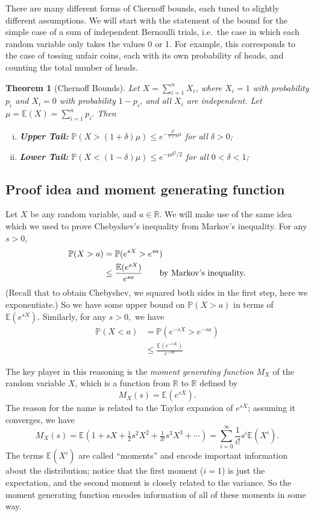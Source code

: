 \documentclass[10pt]{article}
\newtheorem{theorem}{Theorem}
\newcommand{\E}{\mathbb{E}}
\renewcommand{\Pr}{\mathbb{P}}
\begin{document}
There are many different forms of Chernoff bounds, each tuned to
slightly different assumptions. We will start with the statement of
the bound for the simple case of a sum of independent Bernoulli trials, i.e.~the case in which each random variable only takes the values 0 or 1. For example, this corresponds to the case of tossing unfair coins, each with its own probability of heads, and counting the total number of heads.   
\begin{theorem}[Chernoff Bounds]\label{thm:chernoff}
    Let $X = \sum_{i=1}^n X_i$, where $X_i = 1$ with probability $p_i$ and $X_i = 0$ with probability $1-p_i$, and all $X_i$ are independent.
    Let $\mu = \E(X) = \sum_{i=1}^n p_i.$ Then
    \begin{enumerate}[(i)]
        \item {\bf Upper Tail:} $\displaystyle\Pr(X > (1 + \delta)\mu) \leq
          e^{-\frac{\delta^2}{2 + \delta} \mu}$ for all $\delta > 0$;
            \item {\bf Lower Tail:} $\displaystyle\Pr(X  < (1 - \delta)\mu) \leq e^{-\mu \delta^2/2}$ for all $0 < \delta < 1$;
        \end{enumerate}
\end{theorem}



\subsection{Proof idea and moment generating function}


Let $X$ be any random variable, and $a \in \mathbb{R}$.
We will make use of the same idea which we used to prove Chebyshev's inequality from Markov's inequality.
For any $s > 0$, 
\begin{align}
\Pr(X > a) &= \Pr(e^{sX} > e^{sa}) \notag\\
           &\leq \frac{\E(e^{sX})}{e^{sa}} \qquad \text{by Markov's
             inequality.} \label{eq:chernoff}
\end{align}
(Recall that to obtain Chebyshev, we squared both sides in the first step, here we exponentiate.)
So we have some upper bound on $\Pr(X > a)$ in terms of $\E(e^{sX}).$
Similarly, for any $s > 0,$ we have
\begin{align*}
\Pr(X < a) &= \Pr(e^{-sX} > e^{-sa}) \\
           &\leq \frac{\E(e^{-sX})}{e^{-sa}} 
\end{align*}

The key player in this reasoning is the \emph{moment generating function} $M_X$ of the random variable $X$, which is a function from $\mathbb{R}$ to $\mathbb{R}$ defined by
\[ M_X(s) = \E\left(e^{sX}\right). \]
The reason for the name is related to the Taylor expansion of $e^{sX}$; assuming it converges, we have
\[ M_X(s) = \E\left(1 + sX + \tfrac12s^2X^2 + \tfrac1{3!}s^3X^3 + \cdots\right) = \sum_{i=0}^\infty \frac{1}{i!}s^i \E(X^i). \]
The terms $\E(X^i)$ are called ``moments'' and encode important information about the distribution; notice that the first moment ($i=1$) is just the expectation, and the second moment is closely related to the variance. 
So the moment generating function encodes information of all of these moments in some way. 
\end{document}
